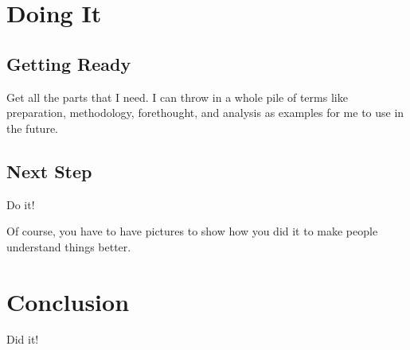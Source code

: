 \documentclass[12pt,glossary]{dalthesis}
\begin{document}
\chapter{Doing It}

\section{Getting Ready}

Get all the parts that I need.  I can throw in a whole pile of terms like
preparation,
methodology,
forethought,
and
analysis
as examples for me to use in the future.

\section{Next Step}

Do it!

Of course, you have to have pictures to show how you did it to make people
understand things better.

\chapter{Conclusion}

Did it!



\end{document}
